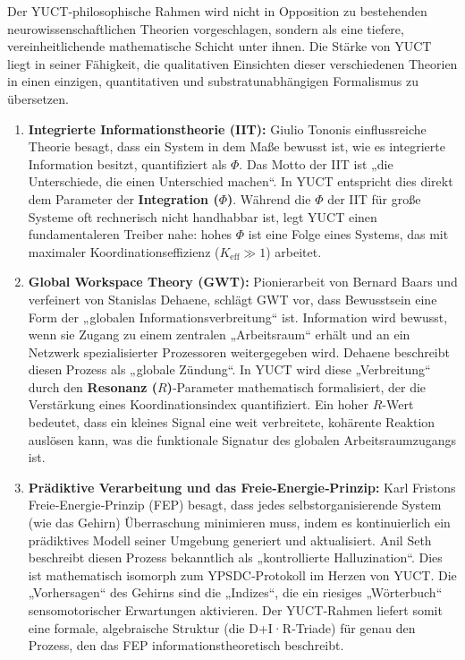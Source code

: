 \documentclass[12pt,a4paper]{article}
\begin{document}
	Der YUCT‑philosophische Rahmen wird nicht in Opposition zu bestehenden neurowissenschaftlichen Theorien vorgeschlagen, sondern als eine tiefere, vereinheitlichende mathematische Schicht unter ihnen. Die Stärke von YUCT liegt in seiner Fähigkeit, die qualitativen Einsichten dieser verschiedenen Theorien in einen einzigen, quantitativen und substratunabhängigen Formalismus zu übersetzen.
	
	\begin{enumerate}
		\item \textbf{Integrierte Informationstheorie (IIT):} Giulio Tononis einflussreiche Theorie besagt, dass ein System in dem Maße bewusst ist, wie es integrierte Information besitzt, quantifiziert als \(\Phi\). Das Motto der IIT ist „die Unterschiede, die einen Unterschied machen“. In YUCT entspricht dies direkt dem Parameter der \textbf{Integration (\(\Phi\))}. Während die \(\Phi\) der IIT für große Systeme oft rechnerisch nicht handhabbar ist, legt YUCT einen fundamentaleren Treiber nahe: hohes \(\Phi\) ist eine Folge eines Systems, das mit maximaler Koordinationseffizienz (\(K_{\mathrm{eff}} \gg 1\)) arbeitet.
		
		\item \textbf{Global Workspace Theory (GWT):} Pionierarbeit von Bernard Baars und verfeinert von Stanislas Dehaene, schlägt GWT vor, dass Bewusstsein eine Form der „globalen Informationsverbreitung“ ist. Information wird bewusst, wenn sie Zugang zu einem zentralen „Arbeitsraum“ erhält und an ein Netzwerk spezialisierter Prozessoren weitergegeben wird. Dehaene beschreibt diesen Prozess als „globale Zündung“. In YUCT wird diese „Verbreitung“ durch den \textbf{Resonanz (\(R\))}‑Parameter mathematisch formalisiert, der die Verstärkung eines Koordinationsindex quantifiziert. Ein hoher \(R\)-Wert bedeutet, dass ein kleines Signal eine weit verbreitete, kohärente Reaktion auslösen kann, was die funktionale Signatur des globalen Arbeitsraumzugangs ist.
		
		\item \textbf{Prädiktive Verarbeitung und das Freie‑Energie‑Prinzip:} Karl Fristons Freie‑Energie‑Prinzip (FEP) besagt, dass jedes selbstorganisierende System (wie das Gehirn) Überraschung minimieren muss, indem es kontinuierlich ein prädiktives Modell seiner Umgebung generiert und aktualisiert. Anil Seth beschreibt diesen Prozess bekanntlich als „kontrollierte Halluzination“. Dies ist mathematisch isomorph zum YPSDC‑Protokoll im Herzen von YUCT. Die „Vorhersagen“ des Gehirns sind die „Indizes“, die ein riesiges „Wörterbuch“ sensomotorischer Erwartungen aktivieren. Der YUCT‑Rahmen liefert somit eine formale, algebraische Struktur (die D+I·R‑Triade) für genau den Prozess, den das FEP informationstheoretisch beschreibt.
		

\end{enumerate}
\end{document}
